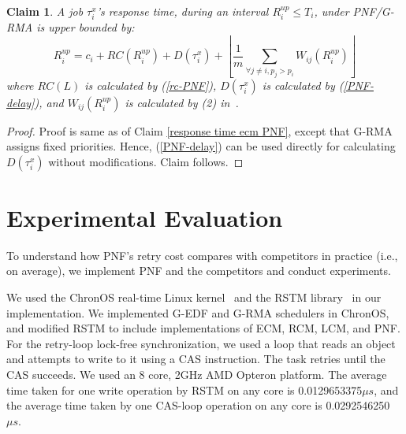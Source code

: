 \documentclass[twocolumn]{article}
\newtheorem{clm}{Claim}
\newtheorem{proof}{Proof}
\begin{document}
\begin{clm}\label{response rcm PNF}
A job $\tau_{i}^{x}$'s response time, during an interval $R_i^{up}\le T_{i}$, under PNF/G-RMA is upper bounded by: 
\begin{equation}
R_{i}^{up}=c_{i}+RC(R_i^{up})+D(\tau_{i}^{x})+\left\lfloor \frac{1}{m}\sum_{\forall j\ne i,p_j>p_i}W_{ij}(R_{i}^{up})\right\rfloor 
\end{equation}
where $RC(L)$ is calculated by (\ref{rc-PNF}), $D(\tau_{i}^{x})$
is calculated by (\ref{PNF-delay}), and $W_{ij}(R_{i}^{up})$
is calculated by (2) in~\cite{stmconcurrencycontrol:emsoft11}.
\end{clm}
\begin{proof}\normalfont
Proof is same as of Claim \ref{response time ecm PNF}, 
except that G-RMA assigns fixed priorities. Hence, (\ref{PNF-delay}) can be used directly for calculating $D(\tau_{i}^{x})$ without modifications. Claim follows.
\end{proof}


\section{Experimental Evaluation}\label{exp_eval}


To understand how PNF's retry cost compares with competitors in practice (i.e., on average), we implement PNF and the competitors and conduct experiments. 


We used the ChronOS real-time Linux kernel~\cite{dellinger2011chronos}
and the RSTM library~\cite{marathe2006lowering} in our implementation. We implemented G-EDF and G-RMA schedulers in ChronOS, and modified RSTM to include implementations of ECM, RCM, LCM, and PNF. For the retry-loop lock-free synchronization, we used a loop that reads an object and attempts to write to it  using a CAS  instruction. The task retries until the CAS succeeds. We used an 8 core, 2GHz AMD Opteron platform. The average time taken for one write operation by RSTM on any core is 0.0129653375$\mu s$, and the average time taken by one CAS-loop operation on any core is 0.0292546250 $\mu s$.
\end{document}
